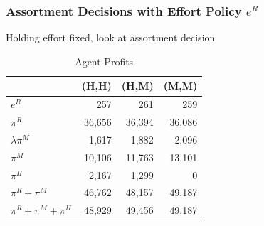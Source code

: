 \documentclass[aspectratio=169,11pt]{beamer}
\begin{document}
\begin{frame}
\frametitle{Assortment Decisions with Effort Policy $e^R$}
Holding effort fixed, look at assortment decision
\begin{table}[htp]
\caption{Agent Profits}
\begin{center}
\begin{tabular}{|l| rrr|}
\hline
 & (H,H) & (H,M) & (M,M) \\
 \hline
$e^{R}$ & 257 & 261 & 259 \\ \hline
$\pi^R$ & 36,656 & 36,394 & 36,086 \\
$\lambda \pi^M$ & 1,617 & 1,882  & 2,096\\
$\pi^M$ & 10,106 & 11,763 & 13,101 \\
$\pi^H$ & 2,167 & 1,299 & 0 \\
$\pi^{R} +\pi^{M}$ & 46,762 & 48,157 & 49,187 \\
$\pi^R + \pi^M + \pi^H$ & 48,929 & 49,456 & 49,187 \\ \hline
\end{tabular}
\end{center}
\label{tab:assortmentonly}
\end{table}
\end{frame}
\end{document}

